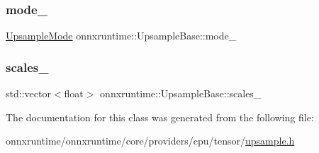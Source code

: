 \subsubsection{\texorpdfstring{mode\+\_\+}{mode\_}}
{\footnotesize\ttfamily \mbox{\hyperlink{namespaceonnxruntime_ac1731b73e10b6a91015c32c7e29d03bd}{Upsample\+Mode}} onnxruntime\+::\+Upsample\+Base\+::mode\+\_\+\hspace{0.3cm}{\ttfamily [protected]}}

\mbox{\label{classonnxruntime_1_1UpsampleBase_a3be327fb9739ba0afd7881ac87b91d1f}} 
\subsubsection{\texorpdfstring{scales\+\_\+}{scales\_}}
{\footnotesize\ttfamily std\+::vector$<$float$>$ onnxruntime\+::\+Upsample\+Base\+::scales\+\_\+\hspace{0.3cm}{\ttfamily [protected]}}



The documentation for this class was generated from the following file\+:\begin{DoxyCompactItemize}
\item 
onnxruntime/onnxruntime/core/providers/cpu/tensor/\mbox{\hyperlink{cpu_2tensor_2upsample_8h}{upsample.\+h}}\end{DoxyCompactItemize}
